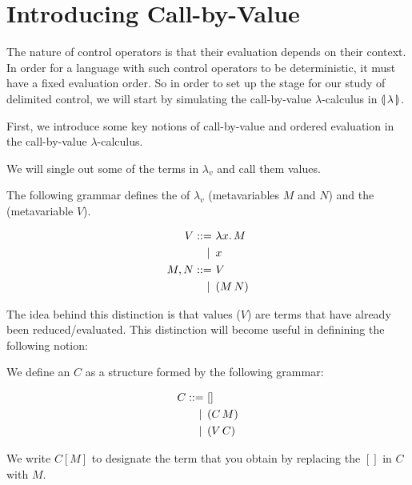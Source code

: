 
\minitoc

\section{Introducing Call-by-Value}
\label{sec:introducing-cbv}

The nature of control operators is that their evaluation depends on their
context. In order for a language with such control operators to be
deterministic, it must have a fixed evaluation order. So in order to set up
the stage for our study of delimited control, we will start by simulating
the call-by-value $\lambda$-calculus in $\llparenthesis \, \lambda \, \rrparenthesis$.

First, we introduce some key notions of call-by-value and ordered
evaluation in the call-by-value $\lambda$-calculus.

We will single out some of the terms in $\lambda_v$ and call them values.

\begin{definition}
  The following grammar defines the  of $\lambda_v$
  (metavariables $M$ and $N$) and the  (metavariable $V$).

\begin{align*}
  V ::= &\ \lambda x.\, M \\
   | \, &\ x \\
  M, N ::= &\ V \\
   | \, &\ (M\,N)
\end{align*}
\end{definition}

The idea behind this distinction is that values ($V$) are terms that have
already been reduced/evaluated. This distinction will become useful in
definining the following notion:

\begin{definition}
  We define an  $C$ as a structure formed by the
  following grammar:

\begin{align*}
  C ::= &\ [] \\
  | \, &\ (C\,M) \\
  | \, &\ (V\,C)
\end{align*}

  We write $C[M]$ to designate the term that you obtain by replacing the
  $[]$ in $C$ with $M$.
\end{definition}

